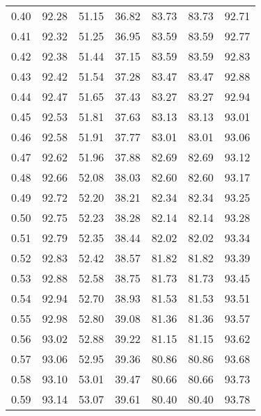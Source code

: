 \begin{tabular}{|c|c|c|c|c|c|c|}
      0.40 &     92.28 &     51.15 &      36.82 &   83.73 &      83.73 &         92.71 \\
      0.41 &     92.32 &     51.25 &      36.95 &   83.59 &      83.59 &         92.77 \\
      0.42 &     92.38 &     51.44 &      37.15 &   83.59 &      83.59 &         92.83 \\
      0.43 &     92.42 &     51.54 &      37.28 &   83.47 &      83.47 &         92.88 \\
      0.44 &     92.47 &     51.65 &      37.43 &   83.27 &      83.27 &         92.94 \\
      0.45 &     92.53 &     51.81 &      37.63 &   83.13 &      83.13 &         93.01 \\
      0.46 &     92.58 &     51.91 &      37.77 &   83.01 &      83.01 &         93.06 \\
      0.47 &     92.62 &     51.96 &      37.88 &   82.69 &      82.69 &         93.12 \\
      0.48 &     92.66 &     52.08 &      38.03 &   82.60 &      82.60 &         93.17 \\
      0.49 &     92.72 &     52.20 &      38.21 &   82.34 &      82.34 &         93.25 \\
      0.50 &     92.75 &     52.23 &      38.28 &   82.14 &      82.14 &         93.28 \\
      0.51 &     92.79 &     52.35 &      38.44 &   82.02 &      82.02 &         93.34 \\
      0.52 &     92.83 &     52.42 &      38.57 &   81.82 &      81.82 &         93.39 \\
      0.53 &     92.88 &     52.58 &      38.75 &   81.73 &      81.73 &         93.45 \\
      0.54 &     92.94 &     52.70 &      38.93 &   81.53 &      81.53 &         93.51 \\
      0.55 &     92.98 &     52.80 &      39.08 &   81.36 &      81.36 &         93.57 \\
      0.56 &     93.02 &     52.88 &      39.22 &   81.15 &      81.15 &         93.62 \\
      0.57 &     93.06 &     52.95 &      39.36 &   80.86 &      80.86 &         93.68 \\
      0.58 &     93.10 &     53.01 &      39.47 &   80.66 &      80.66 &         93.73 \\
      0.59 &     93.14 &     53.07 &      39.61 &   80.40 &      80.40 &         93.78 \\

\end{tabular}

